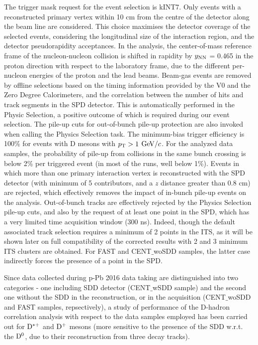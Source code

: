The trigger mask request for the event selection is kINT7. Only events with a reconstructed primary vertex within 10 cm from the centre of the detector along the beam line are considered. This choice maximises the detector coverage of the selected events, considering the longitudinal size of the interaction region, and
the detector pseudorapidity acceptances. In the analysis, the center-of-mass reference frame of the nucleon-nucleon collision is shifted in rapidity by $y_{\rm NN}$ = 0.465 in the proton direction with respect to the laboratory frame, due to the different per-nucleon energies of the proton and the lead beams.
Beam-gas events are removed by offline selections based on the timing information provided by the V0 and the Zero Degree Calorimeters, and the correlation between the number of hits and track segments in the SPD detector. This is automatically performed in the Physic Selection, a positive outcome of which is required during our event selection. The pile-up cuts for out-of-bunch pile-up protection are also invoked when calling the Physics Selection task.
The minimum-bias trigger efficiency is 100\% for events with D mesons with $p_{\rm T} > 1$ $\mathrm{GeV}/c$. For the analyzed data samples, the probability of pile-up from collisions in the same bunch crossing is below 2\% per triggered event (in most of the runs, well below 1\%). Events in which more than one primary interaction vertex is reconstructed with the SPD detector (with minimum of 5 contributors, and a $z$ distance greater than 0.8 cm) are rejected, which effectively removes the impact of in-bunch pile-up events on the analysis. Out-of-bunch tracks are effectively rejected by the Physics Selection pile-up cuts, and also by the request of at least one point in the SPD, which has a very limited time acquisition window (300 ns). Indeed, though the default associated track selection requires a minimum of 2 points in the ITS, as it will be shown later on full compatibility of the corrected results with 2 and 3 minimum ITS clusters are obtained. For FAST and CENT$\_$woSDD samples, the latter case indirectly forces the presence of a point in the SPD.

Since data collected during p-Pb 2016 data taking are distinguished into two categories - one including SDD detector (CENT$\_$wSDD sample) and the second one without the SDD in the reconstruction, or in the acquisition (CENT$\_$woSDD and FAST samples, repsectively), a study of performance of the D-hadron correlation analysis with respect to the data samples employed has been carried out for ${\rm D^{*+}}$ and ${\rm D^+}$ mesons (more sensitive to the presence of the SDD w.r.t. the ${\rm D^0}$, due to their reconstruction from three decay tracks).

